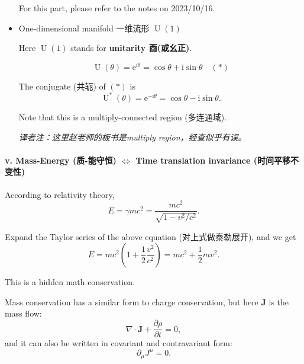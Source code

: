 \begin{itemize}
  For this part, please refer to the notes on 2023/10/16.
\item
  One-dimensional manifold 一维流形 \(\operatorname U(1)\)

  Here \(\operatorname U(1)\) stands for \textbf{unitarity 酉(或幺正)}.

  \[\operatorname U(\theta) = \mathrm{e}^{\mathrm{i} \theta} = \cos \theta + \mathrm{i} \sin \theta \quad (*)\]

  The conjugate (共轭) of \((*)\) is
  \[\operatorname U^*(\theta) = \mathrm{e}^{- \mathrm{i} \theta} = \cos \theta - \mathrm{i} \sin \theta.\]

  Note that this is a multiply-connected region (多连通域).

  \emph{译者注：这里赵老师的板书是multiply region，经查似乎有误。}
\end{itemize}

\paragraph{v. Mass-Energy (质-能守恒) \(\Leftrightarrow\)
Time translation invariance
(时间平移不变性)}\label{mass-energy-ux8d28-ux80fdux5b88ux6052-leftrightarrow-time-translation-invariance-ux65f6ux95f4ux5e73ux79fbux4e0dux53d8ux6027}

According to relativity theory,
\[E = \gamma mc^2 = \frac{mc^2}{\sqrt{1 - v^2 / c^2}}.\]

Expand the Taylor series of the above equation (对上式做泰勒展开), and
we get
\[E = mc^2 \left( 1 + \frac{1}{2} \frac{v^2}{c^2} \right) = mc^2 + \frac{1}{2} mv^2.\]

This is a hidden math conservation.

Mass conservation has a similar form to charge conservation, but here
\(\boldsymbol{J}\) is the mass flow:
\[\nabla \cdot \boldsymbol{J} + \frac{\partial \rho}{\partial t} = 0,\]
and it can also be written in covariant and contravariant form:
\[\partial_{\mu} J^{\mu} = 0.\]
